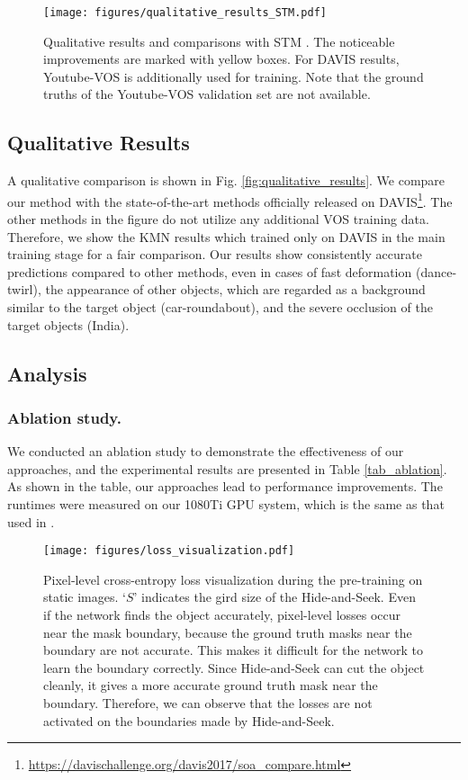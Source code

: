 \begin{figure}
\centering
\texttt{[image: figures/qualitative\_results\_STM.pdf]}
\caption{
Qualitative results and comparisons with STM \cite{Oh_2019_ICCV}. The noticeable improvements are marked with yellow boxes. For DAVIS results, Youtube-VOS is additionally used for training. Note that the ground truths of the Youtube-VOS validation set are not available.
}
\label{fig:qualitative_results_STM}
\end{figure}

\subsection{Qualitative Results}
\label{s45}
A qualitative comparison is shown in Fig. \ref{fig:qualitative_results}. We compare our method with the state-of-the-art methods officially released on DAVIS\footnote{\url{https://davischallenge.org/davis2017/soa\_compare.html}}. The other methods in the figure do not utilize any additional VOS training data. Therefore, we show the KMN results which trained only on DAVIS in the main training stage for a fair comparison. Our results show consistently accurate predictions compared to other methods, even in cases of fast deformation (dance-twirl), the appearance of other objects, which are regarded as a background similar to the target object (car-roundabout), and the severe occlusion of the target objects (India).

\subsection{Analysis}
\label{s46}
\subsubsection{Ablation study.}
We conducted an ablation study to demonstrate the effectiveness of our approaches, and the experimental results are presented in Table \ref{tab_ablation}. As shown in the table, our approaches lead to performance improvements. The runtimes were measured on our 1080Ti GPU system, which is the same as that used in \cite{Oh_2019_ICCV}.

\begin{figure}[t]
\centering
\texttt{[image: figures/loss\_visualization.pdf]}
\caption{
Pixel-level cross-entropy loss visualization during the pre-training on static images. `$S$' indicates the gird size of the Hide-and-Seek. Even if the network finds the object accurately, pixel-level losses occur near the mask boundary, because the ground truth masks near the boundary are not accurate. This makes it difficult for the network to learn the boundary correctly. Since  Hide-and-Seek can cut the object cleanly, it gives a more accurate ground truth mask near the boundary. Therefore, we can observe that the losses are not activated on the boundaries made by Hide-and-Seek.
}
\label{fig:loss_visualization}
\end{figure}

